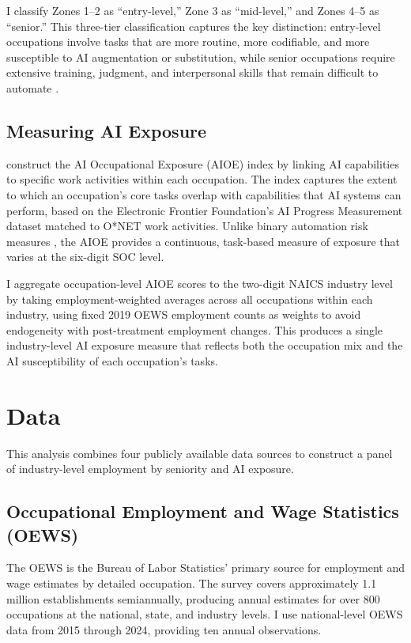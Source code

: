 \documentclass[12pt]{article}
\begin{document}
I classify Zones 1--2 as ``entry-level,'' Zone 3 as ``mid-level,'' and Zones 4--5 as ``senior.'' This three-tier classification captures the key distinction: entry-level occupations involve tasks that are more routine, more codifiable, and more susceptible to AI augmentation or substitution, while senior occupations require extensive training, judgment, and interpersonal skills that remain difficult to automate \citep{deming2017, agrawal2019}.

\subsection{Measuring AI Exposure}

\citet{felten2021} construct the AI Occupational Exposure (AIOE) index by linking AI capabilities to specific work activities within each occupation. The index captures the extent to which an occupation's core tasks overlap with capabilities that AI systems can perform, based on the Electronic Frontier Foundation's AI Progress Measurement dataset matched to O*NET work activities. Unlike binary automation risk measures \citep{frey2017}, the AIOE provides a continuous, task-based measure of exposure that varies at the six-digit SOC level.

I aggregate occupation-level AIOE scores to the two-digit NAICS industry level by taking employment-weighted averages across all occupations within each industry, using fixed 2019 OEWS employment counts as weights to avoid endogeneity with post-treatment employment changes. This produces a single industry-level AI exposure measure that reflects both the occupation mix and the AI susceptibility of each occupation's tasks.


\section{Data}

This analysis combines four publicly available data sources to construct a panel of industry-level employment by seniority and AI exposure.

\subsection{Occupational Employment and Wage Statistics (OEWS)}

The OEWS is the Bureau of Labor Statistics' primary source for employment and wage estimates by detailed occupation. The survey covers approximately 1.1 million establishments semiannually, producing annual estimates for over 800 occupations at the national, state, and industry levels. I use national-level OEWS data from 2015 through 2024, providing ten annual observations.
\end{document}
